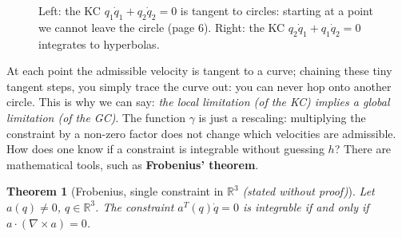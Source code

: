 \documentclass[11pt,a4paper]{article}
\theoremstyle{definition}
\theoremstyle{plain}
\newtheorem{theorem}[definition]{Theorem}
\begin{document}
\begin{figure}[H]
\centering
{}
\caption{Left: the KC $q_1\dot q_1+q_2\dot q_2=0$ is tangent to circles: starting at a point we cannot leave the circle (page 6). Right: the KC $q_2\dot q_1+q_1\dot q_2=0$ integrates to hyperbolas.}
\end{figure}
 
\begin{intuition}
At each point the admissible velocity is tangent to a curve; chaining these tiny tangent steps, you simply trace the curve out: you can never hop onto another circle. This is why we can say: \emph{the local limitation (of the KC) implies a global limitation (of the GC)}. The function $\gamma$ is just a rescaling: multiplying the constraint by a non-zero factor does not change which velocities are admissible. How does one know if a constraint is integrable without guessing $h$? There are mathematical tools, such as \textbf{Frobenius' theorem}.
\end{intuition}
 
\begin{theorem}[Frobenius, single constraint in $\mathbb R^3$ \emph{(stated without proof)}]\label{thm:frob}
Let $a(q)\neq0$, $q\in\mathbb R^3$. The constraint $a^{T}(q)\dot q=0$ is integrable if and only if $a\cdot(\nabla\times a)=0$.
\end{theorem}
 
\end{document}
